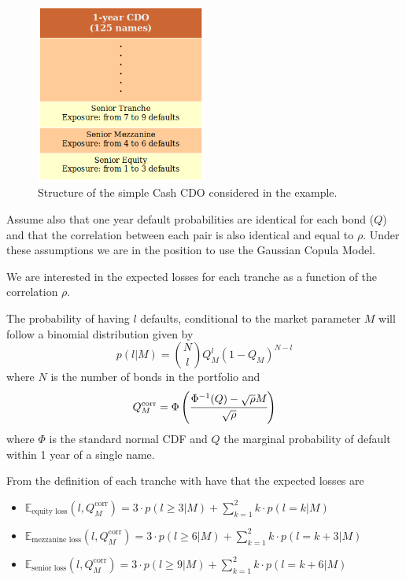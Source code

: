 \begin{figure}[htb]
	\centering
	\includegraphics[width=0.5\textwidth]{figures/ex_cdo_1}
	\caption{Structure of the simple Cash CDO considered in the example.}
	\label{fig:cdo_ex_1}
\end{figure}

Assume also that one year default probabilities are identical for each bond 
($Q$) and that the correlation between each pair is also identical and equal to $\rho$.
Under these assumptions we are in the position to use the Gaussian Copula Model. 

We are interested in the expected losses for each tranche as a function of the correlation $\rho$.

The probability of having $l$ defaults, conditional to the market parameter $M$ will follow a binomial distribution given by
\begin{equation}
p(l|M) = \binom{N}{l}Q_M^l (1-Q_M)^{N-l}
\label{eq:def_prob_ex_cdo_1}
\end{equation}
where $N$ is the number of bonds in the portfolio and 
\begin{equation}
Q_M^{\textrm{corr}} = \Phi\left(\cfrac{\Phi^{-1}(Q)-\sqrt{\rho}M}{\sqrt{\-\rho}}\right)
\end{equation}
where $\Phi$ is the standard normal CDF and $Q$ the marginal probability of default 
within 1 year of a single name.

From the definition of each tranche with have that the expected losses are
\begin{itemize}
	\item $\mathbb{E}_{\textrm{equity loss}}(l, Q_M^{\textrm{corr}})=3\cdot p(l\ge 3|M) + \sum_{k=1}^{2}k\cdot p(l=k|M)$
	\item $\mathbb{E}_{\textrm{mezzanine loss}}(l, Q_M^{\textrm{corr}})=3\cdot p(l\ge 6|M) + \sum_{k=1}^{2}k\cdot p(l=k+3|M)$
	\item $\mathbb{E}_{\textrm{senior loss}}(l, Q_M^{\textrm{corr}})=3\cdot p(l\ge 9|M) + \sum_{k=1}^{2}k\cdot p(l=k+6|M)$
\end{itemize}
	

